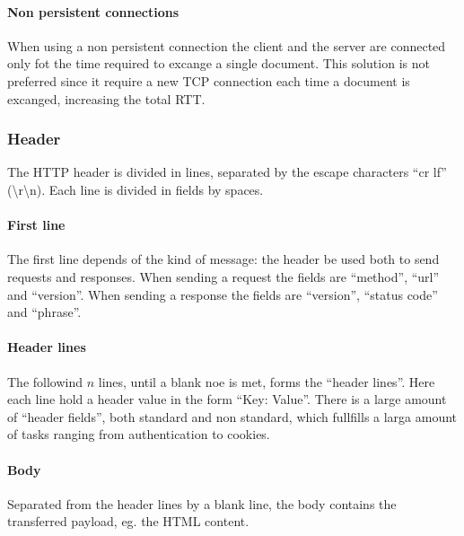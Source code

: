 \paragraph{Non persistent connections}
When using a non persistent connection the client and the server are connected only fot the time required to excange a single document. This solution is not preferred since it require a new TCP connection each time a document is excanged, increasing the total RTT.

\subsubsection{Header}

The HTTP header is divided in lines, separated by the escape characters ``cr lf'' (\textbackslash r\textbackslash n).
Each line is divided in fields by spaces.

\paragraph{First line}
The first line depends of the kind of message: the header be used both to send requests and responses. When sending a request the fields are ``method'', ``url'' and ``version''. When sending a response the fields are ``version'', ``status code'' and ``phrase''.

\paragraph{Header lines}
The followind $n$ lines, until a blank noe is met, forms the ``header lines''. Here each line hold a header value in the form ``Key: Value''. There is a large amount of ``header fields'', both standard and non standard, which fullfills a larga amount of tasks ranging from authentication to cookies.

\paragraph{Body}
Separated from the header lines by a blank line, the body contains the transferred payload, eg. the HTML content.

